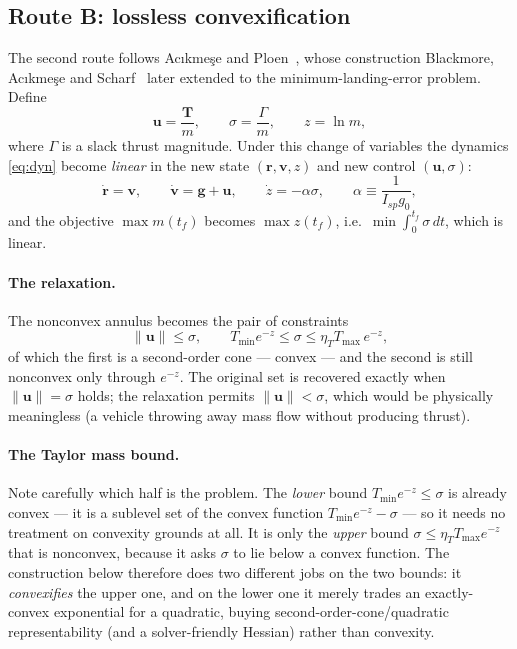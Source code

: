 \documentclass[11pt]{article}
\newcommand{\rvec}{\mathbf{r}}
\newcommand{\vvec}{\mathbf{v}}
\newcommand{\Tvec}{\mathbf{T}}
\newcommand{\uvec}{\mathbf{u}}
\newcommand{\gvec}{\mathbf{g}}
\newcommand{\Tmin}{T_{\min}}
\newcommand{\Tmax}{T_{\max}}
\newcommand{\etaT}{\eta_T}
\begin{document}
\subsection{Route B: lossless convexification}
\label{sec:convex}

The second route follows Ac\i kme\c{s}e and Ploen~\cite{acikmese2007}, whose
construction Blackmore, Ac\i kme\c{s}e and Scharf~\cite{blackmore2010} later
extended to the minimum-landing-error problem. Define
%
\begin{equation}
\uvec = \frac{\Tvec}{m}, \qquad
\sigma = \frac{\Gamma}{m}, \qquad
z = \ln m ,
\label{eq:cov}
\end{equation}
%
where $\Gamma$ is a slack thrust magnitude. Under this change of variables
the dynamics \eqref{eq:dyn} become \emph{linear} in the new state
$(\rvec,\vvec,z)$ and new control $(\uvec,\sigma)$:
%
\begin{equation}
\dot{\rvec} = \vvec, \qquad
\dot{\vvec} = \gvec + \uvec, \qquad
\dot{z} = -\alpha \sigma, \qquad \alpha \equiv \frac{1}{I_{sp} g_0},
\label{eq:linear}
\end{equation}
%
and the objective $\max m(t_f)$ becomes $\max z(t_f)$, i.e.\ $\min
\int_0^{t_f}\sigma\,dt$, which is linear.

\paragraph{The relaxation.}
The nonconvex annulus becomes the pair of constraints
%
\begin{equation}
\lVert \uvec \rVert \le \sigma, \qquad
\Tmin e^{-z} \le \sigma \le \etaT \Tmax\, e^{-z},
\label{eq:relax}
\end{equation}
%
of which the first is a second-order cone --- convex --- and the second is
still nonconvex only through $e^{-z}$. The original set is recovered exactly
when $\lVert\uvec\rVert = \sigma$ holds; the relaxation permits
$\lVert\uvec\rVert < \sigma$, which would be physically meaningless (a
vehicle throwing away mass flow without producing thrust).

\paragraph{The Taylor mass bound.}
Note carefully which half is the problem. The \emph{lower} bound
$\Tmin e^{-z} \le \sigma$ is already convex --- it is a sublevel set of the
convex function $\Tmin e^{-z} - \sigma$ --- so it needs no treatment on
convexity grounds at all. It is only the \emph{upper} bound
$\sigma \le \etaT\Tmax e^{-z}$ that is nonconvex, because it asks $\sigma$
to lie below a convex function. The construction below therefore does two
different jobs on the two bounds: it \emph{convexifies} the upper one, and
on the lower one it merely trades an exactly-convex exponential for a
quadratic, buying second-order-cone/quadratic representability (and a
solver-friendly Hessian) rather than convexity.
\end{document}
